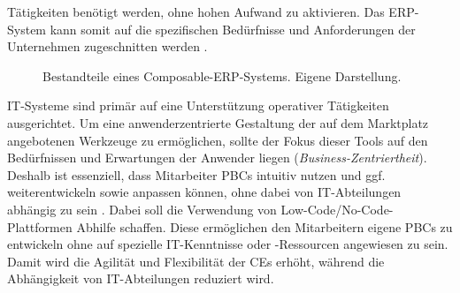 Tätigkeiten benötigt werden, ohne hohen Aufwand zu aktivieren. Das ERP-System kann somit auf die spezifischen Bedürfnisse und Anforderungen der Unternehmen zugeschnitten werden \cite{.20230313}.
\begin{center}
	\begin{figure}[H]
		\centering
		\caption[Bestandteile eines Composable-ERP-Systems]{Bestandteile eines Composable-ERP-Systems. Eigene Darstellung.}
		\label{fig:CERP}
	\end{figure}	
\end{center}
\vspace*{-15mm}
IT-Systeme sind primär auf eine Unterstützung operativer Tätigkeiten ausgerichtet. Um eine anwenderzentrierte Gestaltung der auf dem Marktplatz angebotenen Werkzeuge zu ermöglichen, sollte der Fokus dieser Tools auf den Bedürfnissen und Erwartungen der Anwender liegen (\textit{Business-Zentriertheit}). Deshalb ist essenziell, dass Mitarbeiter PBCs intuitiv nutzen und ggf. weiterentwickeln sowie anpassen können, ohne dabei von IT-Abteilungen abhängig zu sein \cite{.20230313}. Dabei soll die Verwendung von Low-Code/No-Code-Plattformen Abhilfe schaffen. Diese ermöglichen den Mitarbeitern eigene PBCs zu entwickeln ohne auf spezielle IT-Kenntnisse oder -Ressourcen angewiesen zu sein. Damit wird die Agilität und Flexibilität der CEs erhöht, während die Abhängigkeit von IT-Abteilungen reduziert wird.

